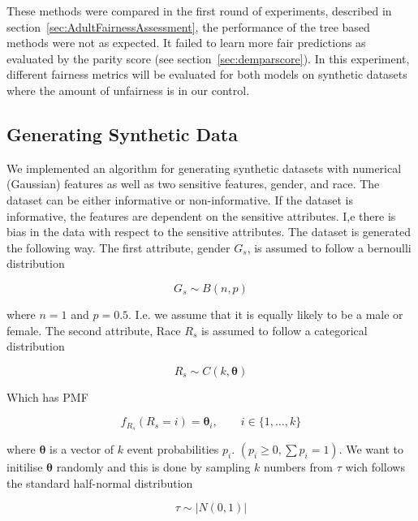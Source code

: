 These methods were compared in the first round of experiments, described in section~\ref{sec:AdultFairnessAssessment}, the performance of the tree based methods were not as expected. It failed to learn more fair predictions as evaluated by the parity score (see section~\ref{sec:demparscore}). In this experiment, different fairness metrics will be evaluated for both models on synthetic datasets where the amount of unfairness is in our control.

\subsection{Generating Synthetic Data}

We implemented an algorithm for generating synthetic datasets with numerical (Gaussian) features as well as two sensitive features, gender, and race. The dataset can be either informative or non-informative. If the dataset is informative, the features are dependent on the sensitive attributes. I,e there is bias in the data with respect to the sensitive attributes. The dataset is generated the following way. The first attribute, gender $G_s$, is assumed to follow a bernoulli distribution

\begin{equation*}
    G_s \sim B(n, p)
\end{equation*}

where $n = 1$ and $p = 0.5$. I.e. we assume that it is equally likely to be a male or female. The second attribute, Race $R_s$ is assumed to follow a categorical distribution 

\begin{equation*}
    R_s \sim C(k, \boldsymbol{\theta})
\end{equation*}

Which has PMF

\begin{equation*}
    f_{R_s}(R_s = i) = \boldsymbol{\theta}_i, \qquad i \in \{ 1, \dots, k\}
\end{equation*}

where $\boldsymbol{\theta}$ is a vector of $k$ event probabilities $p_i$. $(p_i \geq 0, \sum p_i = 1)$. We want to initilise $\boldsymbol{\theta}$ randomly and this is done by sampling $k$ numbers from $\tau$ wich follows the standard half-normal distribution

\begin{equation*}
    \tau \sim |N(0, 1)|
\end{equation*}

